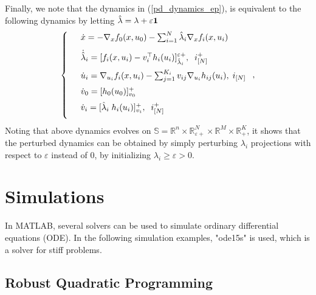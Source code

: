 \documentclass[journal,twoside,web]{ieeecolor}
\begin{document}
Finally, we note that the dynamics in (\ref{pd_dynamics_ep}), is equivalent to the following dynamics by letting $\hat{\lambda}=\lambda+\varepsilon {\bf 1}$
\begin{align} \label{pd_dynamics_0}
\left\{
\begin{array}{cl}
\vspace{3mm}
&\dot x=-\nabla_x f_0(x,u_0)-\sum_{i=1}^N\hat{\lambda}_i \nabla_x f_i(x,u_i)\\
\vspace{2mm}
&\dot{\hat{\lambda}}_i=[f_i(x,u_i)-v_i^\top h_i(u_i)]_{\hat{\lambda}_i}^{\varepsilon +},\;\; i^+_{[N]}\\
\vspace{2mm}
&\dot u_i=\nabla_{u_i}f_i(x,u_i)-\sum_{j=1}^{K_i} v_{ij} \nabla_{u_i} h_{ij}(u_i),\; i_{[N]}\\
\vspace{2mm}
&\dot{v}_0=[h_0(u_0)]_{v_0}^+\\
\vspace{2mm}
&\dot v_i=[\hat{\lambda}_i \; h_i(u_i)]_{v_i}^+,\;\;i^+_{[N]}
\end{array}\right.,
\end{align}
Noting that above dynamics evolves on $\mathbb{S}= \mathbb{R}^n \times \mathbb{R}^N_{\varepsilon +} \times \mathbb{R}^M \times \mathbb{R}^K_+$, it shows that the perturbed dynamics can be obtained by simply perturbing $\lambda_i$ projections with respect to $\varepsilon$ instead of $0$, by initializing $\lambda_i \geq \varepsilon > 0$.

\section{Simulations}\label{section_simulations}
In MATLAB, several solvers can be used to simulate ordinary differential equations (ODE). In the following simulation examples, "ode15s" is used, which is a solver for stiff problems.

\subsection{Robust Quadratic Programming}
\end{document}
